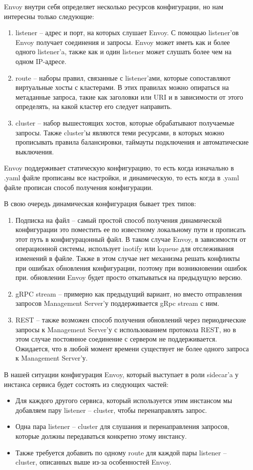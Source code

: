Envoy внутри себя определяет несколько ресурсов конфигурации, но нам интересны только следующие:
\begin{enumerate}
	\item listener -- адрес и порт, на которых слушает Envoy. С помощью listener'ов Envoy получает соединения и запросы. Envoy может иметь как и более одного listener'a, также как и один listener может слушать более чем на одном IP-адресе.
	\item route -- наборы правил, связанные с listener'ами, которые сопоставляют виртуальные хосты с кластерами. В этих правилах можно опираться на метаданные запроса, такие как заголовки или URI и в зависимости от этого определять, на какой кластер его следует направить.
	\item cluster -- набор вышестоящих хостов, которые обрабатывают получаемые запросы. Также cluster'ы являются теми ресурсами, в которых можно прописывать правила балансировки, таймауты подключения и автоматические выключения.
\end{enumerate}
Envoy поддерживает статическую конфигурацию, то есть когда изначально в .yaml файле прописаны все настройки, и динамическую, то есть когда в .yaml файле прописан способ получения конфигурации.

В свою очередь динамическая конфигурация бывает трех типов:
\begin{enumerate}
	\item Подписка на файл -- самый простой способ получения динамической конфигурации это поместить ее по известному локальному пути и прописать этот путь в конфигурацонный файл. В таком случае Envoy, в зависимости от операционной системы, использует inotify или kqueue для отслеживания изменений в файле. Также в этом случае нет механизма решать конфликты при ошибках обновления конфигурации, поэтому при возникновении ошибок при. обновлении Envoy будет просто откатываться на предыдущую версию.
	\item gRPC stream -- примерно как предыдущий вариант, но вместо отправления запросов Management Server'у поддерживается gRpc stream с ним.
	\item REST -- также возможен способ получения обновлений через периодические запросы к Management Server'у с использованием протокола REST, но в этом случае постоянное соединение с сервером не поддерживается. Ожидается, что в любой момент времени существует не более одного запроса к Management Server'у.
\end{enumerate}

В нашей ситуации конфигурация Envoy, который выступает в роли sidecar'a у инстанса сервиса будет состоять из следующих частей:
\begin{itemize}
	\item Для каждого другого сервиса, который используется этим инстансом мы добавляем пару listener -- cluster, чтобы перенаправлять запрос.
	\item Одна пара listener -- cluster для слушания и перенаправления запросов, которые должны передаваться конкретно этому инстансу.
	\item Также требуется добавить по одному route для каждой пары listener -- cluster, описанных выше из-за особенностей Envoy.
\end{itemize}

